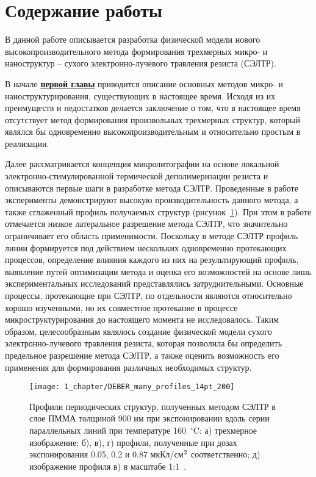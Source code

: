 \chapter*{Содержание работы}
В данной работе описывается разработка физической модели нового высокопроизводительного метода формирования трехмерных микро- и наноструктур -- сухого электронно-лучевого травления резиста (СЭЛТР). 

В начале \underline{\textbf{первой главы}} приводится описание основных методов микро- и наноструктурирования, существующих в настоящее время. Исходя из их преимуществ и недостатков делается заключение о том, что в настоящее время отсутствует метод формирования произвольных трехмерных структур, который являлся бы одновременно высокопроизводительным и относительно простым в реализации.

Далее рассматривается концепция микролитографии на основе локальной электронно-стимулированной термической деполимеризации резиста и описываются первые шаги в разработке метода СЭЛТР.
Проведенные в работе~\cite{Bruk_2016_mee} эксперименты демонстрируют высокую производительность данного метода, а также сглаженный профиль получаемых структур (рисунок~\ref{fig:DEBER_many_profiles}).
При этом в работе отмечается низкое латеральное разрешение метода СЭЛТР, что значительно ограничивает его область применимости.
Поскольку в методе СЭЛТР профиль линии формируется под действием нескольких одновременно протекающих процессов, определение влияния каждого из них на результирующий профиль, выявление путей оптимизации метода и оценка его возможностей на основе лишь экспериментальных исследований представлялись затруднительными.
Основные процессы, протекающие при СЭЛТР, по отдельности являются относительно хорошо изученными, но их совместное протекание в процессе микроструктурирования до настоящего момента не исследовалось.
Таким образом, целесообразным являлось создание физической модели сухого электронно-лучевого травления резиста, которая позволила бы определить предельное разрешение метода СЭЛТР, а также оценить возможность его применения для формирования различных необходимых структур.
\begin{figure}
	\centering
	\texttt{[image: 1\_chapter/DEBER\_many\_profiles\_14pt\_200]}
	\vspace{0.2em}
	\caption{Профили периодических структур, полученных методом СЭЛТР в слое ПММА толщиной 900 нм при экспонировании вдоль серии параллельных линий при температуре 160~$^\circ$C: а) трехмерное изображение; б), в), г) профили, полученные при дозах экспонирования 0.05, 0.2 и 0.87 мкКл/см$^\text{2}$ соответственно; д) изображение профиля в) в масштабе 1:1~\cite{Bruk_2016_mee}.}
	\label{fig:DEBER_many_profiles}
\end{figure}

